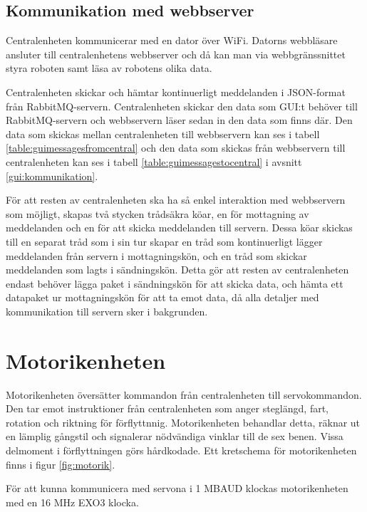\documentclass[a4paper,titlepage,12pt]{article}
\begin{document}
	\subsection{Kommunikation med webbserver}
	Centralenheten kommunicerar med en dator över WiFi. Datorns webbläsare 
	ansluter till centralenhetens webbserver och då kan man
	via webbgränssnittet styra roboten samt läsa av robotens olika data. 
		
	Centralenheten skickar och hämtar kontinuerligt meddelanden i JSON-format från
    RabbitMQ-servern. Centralenheten skickar den data som GUI:t
	behöver till RabbitMQ-servern och webbservern läser sedan in den data som finns där.
	Den data som skickas mellan centralenheten till webbservern kan ses i
	tabell \ref{table:guimessagesfromcentral} och den data som skickas från
    webbservern till centralenheten kan ses i tabell
    \ref{table:guimessagestocentral} i avsnitt \ref{gui:kommunikation}.

    För att resten av centralenheten ska ha så enkel interaktion med
    webbservern som möjligt, skapas två stycken trådsäkra köar, en för mottagning av
    meddelanden och en för att skicka meddelanden till servern. Dessa köar
    skickas till en separat tråd som i sin tur skapar en tråd som kontinuerligt
    lägger meddelanden från servern i mottagningskön, och en tråd som skickar
    meddelanden som lagts i sändningskön. Detta gör att resten av
    centralenheten endast behöver lägga paket i sändningskön för att skicka
    data, och hämta ett datapaket ur mottagningskön för att ta emot data, då
    alla detaljer med kommunikation till servern sker i bakgrunden.

    \newpage
	\section{Motorikenheten}
	Motorikenheten översätter kommandon från centralenheten till servokommandon. Den tar emot 
	instruktioner från centralenheten som anger steglängd, fart, rotation och riktning för 
	förflyttnnig. Motorikenheten behandlar detta, räknar ut en lämplig gångstil och 
	signalerar nödvändiga vinklar till de sex benen. Vissa delmoment i förflyttningen 
	görs hårdkodade. Ett kretschema för motorikenheten finns i figur \ref{fig:motorik}.

	För att kunna kommunicera med servona i 1 MBAUD klockas motorikenheten med en 16 MHz 
	EXO3 klocka.
\end{document}
